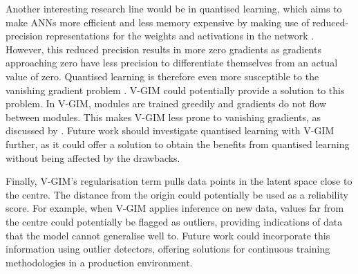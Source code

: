 	Another interesting research line would be in quantised learning, which aims to make ANNs more efficient and less memory expensive by making use of reduced-precision representations for the weights and activations in the network \cite{blottFINNREndtoEndDeepLearning2018}. However, this reduced precision results in more zero gradients as gradients approaching zero have less precision to differentiate themselves from an actual value of zero. Quantised learning is therefore even more susceptible to the vanishing gradient problem \citep{kimDistanceawareQuantization2021}. V-GIM could potentially provide a solution to this problem. In V-GIM, modules are trained greedily and gradients do not flow between modules. This makes V-GIM less prone to vanishing gradients, as discussed by \cite{lowePuttingEndEndtoEnd2020a}. Future work should investigate quantised learning with V-GIM further, as it could offer a solution to obtain the benefits from quantised learning without being affected by the drawbacks.
	
	
	Finally, V-GIM's regularisation term pulls data points in the latent space close to the centre. The distance from the origin could potentially be used as a reliability score. For example, when V-GIM applies inference on new data, values far from the centre could potentially be flagged as outliers, providing indications of data that the model cannot generalise well to. Future work could incorporate this information using outlier detectors, offering solutions for continuous training methodologies in a production environment.
		


		
		
		
		

		
		
